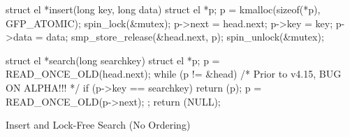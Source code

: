 \begin{listing}[tbp]
\begin{fcvlabel}
\begin{VerbatimL}[commandchars=\\\[\]]
struct el *insert(long key, long data)
{
	struct el *p;
	p = kmalloc(sizeof(*p), GFP_ATOMIC);
	spin_lock(&mutex);
	p->next = head.next;		\lnlbl[init:b]
	p->key = key;
	p->data = data;			\lnlbl[init:e]
	smp_store_release(&head.next, p); \lnlbl[add]
	spin_unlock(&mutex);
}

struct el *search(long searchkey)
{
	struct el *p;
	p = READ_ONCE_OLD(head.next);	\lnlbl[h:next]
	while (p != &head) {
		/* Prior to v4.15, BUG ON ALPHA!!! */ \lnlbl[BUG]
		if (p->key == searchkey) {	\lnlbl[key]
			return (p);
		}
		p = READ_ONCE_OLD(p->next);	\lnlbl[next]
	};
	return (NULL);
}
\end{VerbatimL}
\end{fcvlabel}
\caption{Insert and Lock-Free Search (No Ordering)}
\label{lst:memorder:Insert and Lock-Free Search (No Ordering)}
\end{listing}

